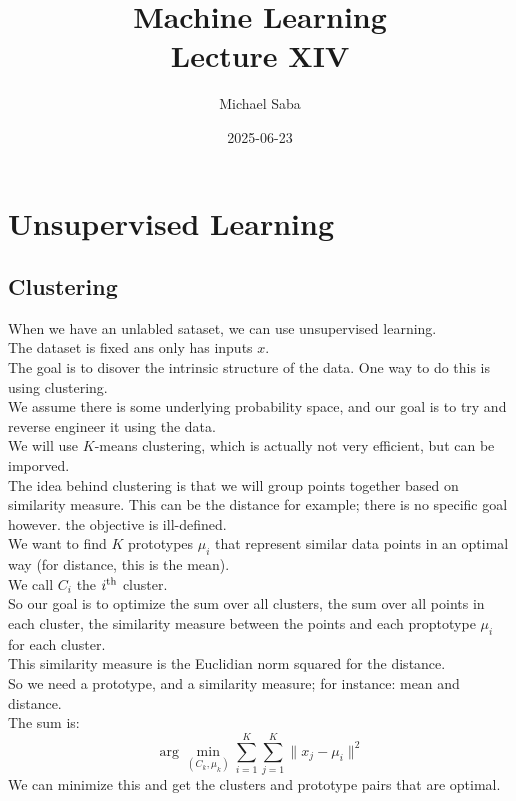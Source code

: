 \documentclass[12pt]{article}
\title{%
    \Huge Machine Learning \\
    \Large Lecture XIV
}
\date{2025-06-23}
\author{Michael Saba}
\begin{document}
\maketitle
\newpage
\setlength{\parindent}{0pt}

\section*{Unsupervised Learning}
\subsection*{Clustering}

When we have an unlabled sataset, we can use
unsupervised learning. \\
The dataset is fixed ans only has inputs $x$. \\

The goal is to disover the intrinsic structure of
the data. One way to do this is using clustering. \\
We assume there is some underlying probability space,
and our goal is to try and reverse engineer it using the
data. \\

We will use $K$-means clustering, which is actually not
very efficient, but can be imporved. \\

The idea behind clustering is that we will group
points together based on similarity measure.
This can be the distance for example; there is no
specific goal however. the objective is ill-defined. \\

We want to find $K$ prototypes $\mu_i$ that represent
similar data points in an optimal way
(for distance, this is the mean). \\
We call $C_i$ the $i^{\text{th}}$ cluster. \\

So our goal is to optimize the sum over all
clusters, the sum over all points in each cluster,
the similarity measure between the points
and each proptotype $\mu_i$ for each cluster. \\
This similarity measure is the Euclidian norm
squared for the distance. \\

So we need a prototype, and a similarity measure;
for instance: mean and distance. \\

The sum is:
\[ \arg \min_{(C_k, \mu_k)} \sum_{i=1}^K \sum_{j=1}^K
\|x_j - \mu_i\|^2 \]
We can minimize this and get the clusters and prototype
pairs that are optimal. \\
\end{document}

